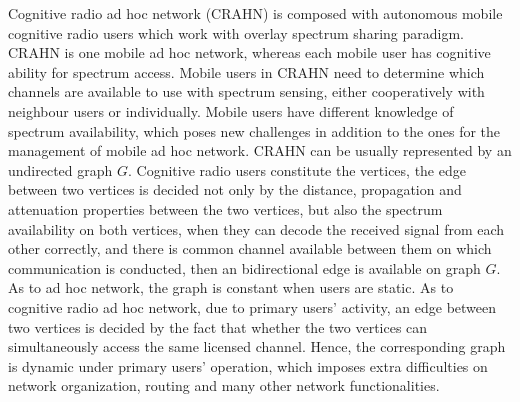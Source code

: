 Cognitive radio ad hoc network (\gls{CRAHN}) is composed with autonomous mobile cognitive radio users which work with overlay spectrum sharing paradigm.
CRAHN is one mobile ad hoc network, whereas each mobile user has cognitive ability for spectrum access.
Mobile users in CRAHN need to determine which channels are available to use with spectrum sensing, either cooperatively with neighbour users or individually.
Mobile users have different knowledge of spectrum availability, which poses new challenges in addition to the ones for the management of mobile ad hoc network.
CRAHN can be usually represented by an undirected graph $G$.
Cognitive radio users constitute the vertices, the edge between two vertices is decided not only by the distance, propagation and attenuation properties between the two vertices, but also the spectrum availability on both vertices, \ie when they can decode the received signal from each other correctly, and there is common channel available between them on which communication is conducted, then an bidirectional edge is available on graph $G$.
As to ad hoc network, the graph is constant when users are static.
As to cognitive radio ad hoc network, due to primary users' activity, an edge between two vertices is decided by the fact that whether the two vertices can simultaneously access the same licensed channel.
Hence, the corresponding graph is dynamic under primary users' operation, which imposes extra difficulties on network organization, routing and many other network functionalities.

